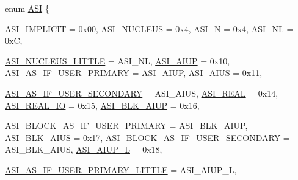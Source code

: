 \begin{DoxyCompactItemize}
\item 
enum \hyperlink{namespaceSparcISA_a6dd43f1311515252b283f56d7095a1f3}{ASI} \{ \par
\hyperlink{namespaceSparcISA_a6dd43f1311515252b283f56d7095a1f3aa054fb8d87e1ceec4e273f4636690a17}{ASI\_\-IMPLICIT} =  0x00, 
\hyperlink{namespaceSparcISA_a6dd43f1311515252b283f56d7095a1f3a7abf94ec93a8c60dcdf9cb89f9bf39be}{ASI\_\-NUCLEUS} =  0x4, 
\hyperlink{namespaceSparcISA_a6dd43f1311515252b283f56d7095a1f3a0401a622da9ee06093be26c0f7916f30}{ASI\_\-N} =  0x4, 
\hyperlink{namespaceSparcISA_a6dd43f1311515252b283f56d7095a1f3a30614290eb7e98666441aab1f9638c4a}{ASI\_\-NL} =  0xC, 
\par
\hyperlink{namespaceSparcISA_a6dd43f1311515252b283f56d7095a1f3a8eff77271357bc606c09fbd9815750b8}{ASI\_\-NUCLEUS\_\-LITTLE} =  ASI\_\-NL, 
\hyperlink{namespaceSparcISA_a6dd43f1311515252b283f56d7095a1f3a3d53402438058d4f84644e2f6c59a013}{ASI\_\-AIUP} =  0x10, 
\hyperlink{namespaceSparcISA_a6dd43f1311515252b283f56d7095a1f3a24e96e1d3cfe5ea47afc3c9e55d0cfeb}{ASI\_\-AS\_\-IF\_\-USER\_\-PRIMARY} =  ASI\_\-AIUP, 
\hyperlink{namespaceSparcISA_a6dd43f1311515252b283f56d7095a1f3aa3d80734431e33615a93b6e582a8da04}{ASI\_\-AIUS} =  0x11, 
\par
\hyperlink{namespaceSparcISA_a6dd43f1311515252b283f56d7095a1f3a56b6cc42aad4a616456dddb978521468}{ASI\_\-AS\_\-IF\_\-USER\_\-SECONDARY} =  ASI\_\-AIUS, 
\hyperlink{namespaceSparcISA_a6dd43f1311515252b283f56d7095a1f3ac1d083610cfc22b4c2c4342f1e7d717f}{ASI\_\-REAL} =  0x14, 
\hyperlink{namespaceSparcISA_a6dd43f1311515252b283f56d7095a1f3aa8242d17bdff731fa0f8cbcc0fa31a40}{ASI\_\-REAL\_\-IO} =  0x15, 
\hyperlink{namespaceSparcISA_a6dd43f1311515252b283f56d7095a1f3ab727126984382a19b9cf54122451b7e8}{ASI\_\-BLK\_\-AIUP} =  0x16, 
\par
\hyperlink{namespaceSparcISA_a6dd43f1311515252b283f56d7095a1f3a724fa3ad21d8f3c97cff350ab1a29f35}{ASI\_\-BLOCK\_\-AS\_\-IF\_\-USER\_\-PRIMARY} =  ASI\_\-BLK\_\-AIUP, 
\hyperlink{namespaceSparcISA_a6dd43f1311515252b283f56d7095a1f3a04fad95a98ffc8b2292774a650b08e52}{ASI\_\-BLK\_\-AIUS} =  0x17, 
\hyperlink{namespaceSparcISA_a6dd43f1311515252b283f56d7095a1f3accdfd68d0f6adafcb0971676bf77cfbe}{ASI\_\-BLOCK\_\-AS\_\-IF\_\-USER\_\-SECONDARY} =  ASI\_\-BLK\_\-AIUS, 
\hyperlink{namespaceSparcISA_a6dd43f1311515252b283f56d7095a1f3a0f67465d8ce0d5558f239ce226ec0550}{ASI\_\-AIUP\_\-L} =  0x18, 
\par
\hyperlink{namespaceSparcISA_a6dd43f1311515252b283f56d7095a1f3a9419a37545c8b71d7696373b3c54367f}{ASI\_\-AS\_\-IF\_\-USER\_\-PRIMARY\_\-LITTLE} =  ASI\_\-AIUP\_\-L, 

\end{DoxyCompactItemize}

